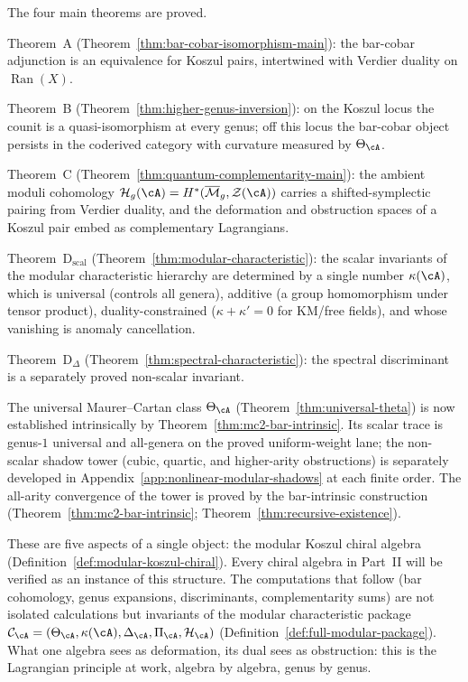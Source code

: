 The four main theorems are proved.

Theorem~A
(Theorem~\ref{thm:bar-cobar-isomorphism-main}): the bar-cobar
adjunction is an equivalence for Koszul pairs, intertwined with
Verdier duality on $\operatorname{Ran}(X)$.

Theorem~B
(Theorem~\ref{thm:higher-genus-inversion}): on the Koszul locus the
counit is a quasi-isomorphism at every genus; off this locus the
bar-cobar object persists in the coderived category with curvature
measured by $\Theta_{\cA}$.

Theorem~C
(Theorem~\ref{thm:quantum-complementarity-main}): the ambient
moduli cohomology $\mathcal{H}_g(\cA) =
H^*(\overline{\mathcal{M}}_g, \mathcal{Z}(\cA))$ carries a
shifted-symplectic pairing from Verdier duality, and the deformation
and obstruction spaces of a Koszul pair embed as complementary
Lagrangians.

Theorem~D$_{\mathrm{scal}}$
(Theorem~\ref{thm:modular-characteristic}): the scalar invariants
of the modular characteristic hierarchy are determined by a single
number $\kappa(\cA)$, which is universal (controls all genera),
additive (a group homomorphism under tensor product), duality-constrained
($\kappa + \kappa' = 0$ for KM/free fields), and whose vanishing is anomaly cancellation.

Theorem~D$_\Delta$
(Theorem~\ref{thm:spectral-characteristic}): the spectral
discriminant is a separately proved non-scalar invariant.

The universal Maurer--Cartan class $\Theta_{\cA}$
(Theorem~\ref{thm:universal-theta}) is now established
intrinsically by Theorem~\ref{thm:mc2-bar-intrinsic}.  Its
scalar trace is genus-$1$ universal and all-genera on the proved
uniform-weight lane; the non-scalar shadow tower
(cubic, quartic, and higher-arity obstructions)
is separately developed in
Appendix~\ref{app:nonlinear-modular-shadows} at each finite
order.  The all-arity convergence of the tower is proved by the
bar-intrinsic construction
(Theorem~\ref{thm:mc2-bar-intrinsic};
Theorem~\ref{thm:recursive-existence}).

These are five aspects of a single object: the modular Koszul chiral
algebra (Definition~\ref{def:modular-koszul-chiral}).  Every chiral
algebra in Part~II will be verified as an instance of this structure.
The computations that follow (bar cohomology, genus expansions,
discriminants, complementarity sums) are not
isolated calculations but invariants of the modular characteristic
package $\mathcal{C}_{\cA} = (\Theta_{\cA}, \kappa(\cA),
\Delta_{\cA}, \Pi_{\cA}, \mathcal{H}_{\cA})$
(Definition~\ref{def:full-modular-package}).
What one algebra sees as
deformation, its dual sees as obstruction: this is the Lagrangian
principle at work, algebra by algebra, genus by genus.


